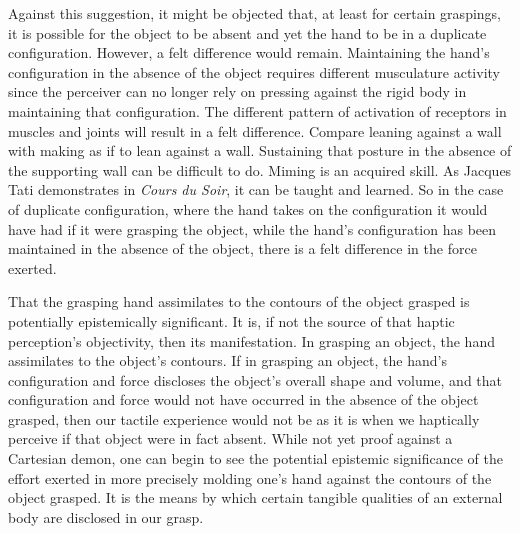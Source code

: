 \documentclass[12pt]{article}
\begin{document}
Against this suggestion, it might be objected that, at least for certain graspings, it is possible for the object to be absent and yet the hand to be in a duplicate configuration. However, a felt difference would remain. Maintaining the hand's configuration in the absence of the object requires different musculature activity since the perceiver can no longer rely on pressing against the rigid body in maintaining that configuration. The different pattern of activation of receptors in muscles and joints will result in a felt difference. Compare leaning against a wall with making as if to lean against a wall. Sustaining that posture in the absence of the supporting wall can be difficult to do. Miming is an acquired skill. As Jacques Tati demonstrates in \emph{Cours du Soir}, it can be taught and learned. So in the case of duplicate configuration, where the hand takes on the configuration it would have had if it were grasping the object, while the hand's configuration has been maintained in the absence of the object, there is a felt difference in the force exerted.

That the grasping hand assimilates to the contours of the object grasped is potentially epistemically significant. It is, if not the source of that haptic perception's objectivity, then its manifestation. In grasping an object, the hand assimilates to the object's contours. If in grasping an object, the hand's configuration and force discloses the object's overall shape and volume, and that configuration and force would not have occurred in the absence of the object grasped, then our tactile experience would not be as it is when we haptically perceive if that object were in fact absent. While not yet proof against a Cartesian demon, one can begin to see the potential epistemic significance of the effort exerted in more precisely molding one's hand against the contours of the object grasped. It is the means by which certain tangible qualities of an external body are disclosed in our grasp. 
\end{document}
